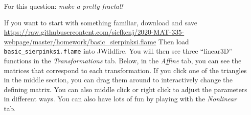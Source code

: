 \documentclass[letter]{article}
\begin{document}
\begin{enumerate}
		For this question: \emph{make a pretty fractal!}

		If you want to start with something familiar, download and save \url{https://raw.githubusercontent.com/siefkenj/2020-MAT-335-webpage/master/homework/basic_sierpinksi.flame}
		Then load \verb|basic_sierpinksi.flame| into JWildfire. You will then see three ``linear3D'' functions in the \emph{Transformations} tab.
		Below, in the \emph{Affine} tab, you can see the matrices that correspond to each transformation. If you click one of the triangles
		in the middle section, you can drag them around to interactively change the defining matrix. You can also middle click or right click to
		adjust the parameters in different ways. You can also have lots of fun by playing with the \emph{Nonlinear} tab.





	\end{enumerate}
\end{document}
